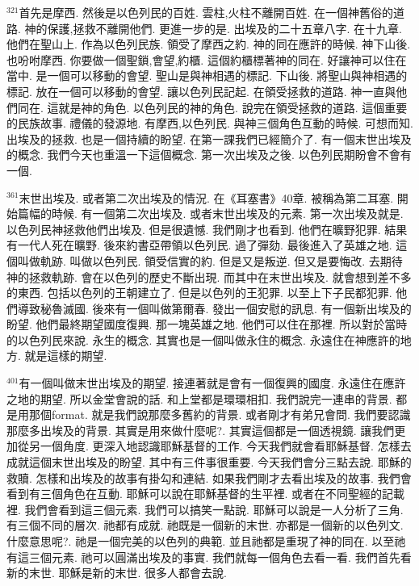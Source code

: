 \documentclass{book}
\begin{document}
$^{321}$首先是摩西.
然後是以色列民的百姓.
雲柱,火柱不離開百姓.
在一個神舊俗的道路.
神的保護,拯救不離開他們.
更進一步的是.
出埃及的二十五章八字.
在十九章.
他們在聖山上.
作為以色列民族.
領受了摩西之約.
神的同在應許的時候.
神下山後.
也吩咐摩西.
你要做一個聖鎖,會望,約櫃.
這個約櫃標著神的同在.
好讓神可以住在當中.
是一個可以移動的會望.
聖山是與神相遇的標記.
下山後.
將聖山與神相遇的標記.
放在一個可以移動的會望.
讓以色列民記起.
在領受拯救的道路.
神一直與他們同在.
這就是神的角色.
以色列民的神的角色.
說完在領受拯救的道路.
這個重要的民族故事.
禮儀的發源地.
有摩西,以色列民.
與神三個角色互動的時候.
可想而知.
出埃及的拯救.
也是一個持續的盼望.
在第一課我們已經簡介了.
有一個末世出埃及的概念.
我們今天也重溫一下這個概念.
第一次出埃及之後.
以色列民期盼會不會有一個.

$^{361}$末世出埃及.
或者第二次出埃及的情況.
在《耳塞書》40章.
被稱為第二耳塞.
開始篇幅的時候.
有一個第二次出埃及.
或者末世出埃及的元素.
第一次出埃及就是.
以色列民神拯救他們出埃及.
但是很遺憾.
我們剛才也看到.
他們在曠野犯罪.
結果有一代人死在曠野.
後來約書亞帶領以色列民.
過了彈劾.
最後進入了英雄之地.
這個叫做軌跡.
叫做以色列民.
領受信實的約.
但是又是叛逆.
但又是要悔改.
去期待神的拯救軌跡.
會在以色列的歷史不斷出現.
而其中在末世出埃及.
就會想到差不多的東西.
包括以色列的王朝建立了.
但是以色列的王犯罪.
以至上下子民都犯罪.
他們導致秘魯滅國.
後來有一個叫做第爾春.
發出一個安慰的訊息.
有一個新出埃及的盼望.
他們最終期望國度復興.
那一塊英雄之地.
他們可以住在那裡.
所以對於當時的以色列民來說.
永生的概念.
其實也是一個叫做永住的概念.
永遠住在神應許的地方.
就是這樣的期望.

$^{401}$有一個叫做末世出埃及的期望.
接連著就是會有一個復興的國度.
永遠住在應許之地的期望.
所以金堂會說的話.
和上堂都是環環相扣.
我們說完一連串的背景.
都是用那個format.
就是我們說那麼多舊約的背景.
或者剛才有弟兄會問.
我們要認識那麼多出埃及的背景.
其實是用來做什麼呢?.
其實這個都是一個透視鏡.
讓我們更加從另一個角度.
更深入地認識耶穌基督的工作.
今天我們就會看耶穌基督.
怎樣去成就這個末世出埃及的盼望.
其中有三件事很重要.
今天我們會分三點去說.
耶穌的救贖.
怎樣和出埃及的故事有掛勾和連結.
如果我們剛才去看出埃及的故事.
我們會看到有三個角色在互動.
耶穌可以說在耶穌基督的生平裡.
或者在不同聖經的記載裡.
我們會看到這三個元素.
我們可以搞笑一點說.
耶穌可以說是一人分析了三角.
有三個不同的層次.
祂都有成就.
祂既是一個新的末世.
亦都是一個新的以色列文.
什麼意思呢?.
祂是一個完美的以色列的典範.
並且祂都是重現了神的同在.
以至祂有這三個元素.
祂可以圓滿出埃及的事實.
我們就每一個角色去看一看.
我們首先看新的末世.
耶穌是新的末世.
很多人都會去說.
\end{document}
